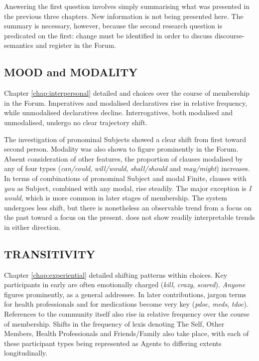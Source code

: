 Answering the first question involves simply summarising what was presented in the previous three chapters. New information is not being presented here. The summary is necessary, however, because the second research question is predicated on the first:  change must be identified in order to discuss \glspl{discourse-semantic} and register in the \gls{Forum}. 

\subsection{MOOD and MODALITY}

Chapter \ref{chap:interpersonal} detailed  and  choices over the course of membership in the \gls{Forum}. Imperatives and modalised declaratives rise in relative frequency, while unmodalised declaratives decline. Interrogatives, both modalised and unmodalised, undergo no clear trajectory shift.

The investigation of pronominal Subjects showed a clear shift from first toward second person. Modality was also shown to figure prominently in the \gls{Forum}. Absent consideration of other  features, the proportion of clauses modalised by any of four types (\emph{can\slash could}, \emph{will\slash would}, \emph{shall\slash should} and \emph{may\slash might}) increases. In terms of combinations of pronominal Subject and modal Finite, clauses with \emph{you} as Subject, combined with any modal, rise steadily. The major exception is \emph{I would}, which is more common in later stages of membership. The  system undergoes less shift, but there is nonetheless an observable trend from a focus on the past toward a focus on the present.  does not show readily interpretable trends in either direction.

\subsection{TRANSITIVITY}

Chapter \ref{chap:experiential} detailed shifting patterns within  choices. Key participants in early  are often emotionally charged (\emph{kill}, \emph{crazy}, \emph{scared}). \emph{Anyone} figures prominently, as a general addressee. In later contributions, jargon terms for health professionals and for medications become very key (\emph{pdoc}, \emph{meds}, \emph{tdoc}). References to the community itself also rise in relative frequency over the course of membership. Shifts in the frequency of lexis denoting The Self, Other Members, Health Professionals and Friends\slash Family also take place, with each of these participant types being represented as Agents to differing extents longitudinally.

